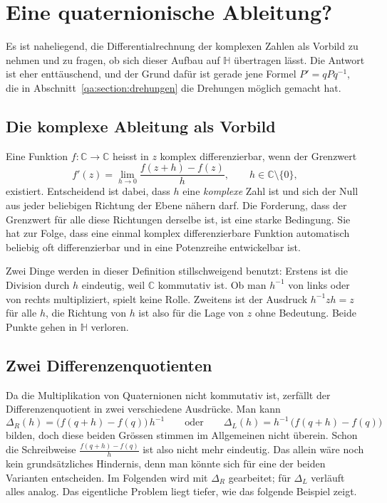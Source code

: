 %
%
%
\section{Eine quaternionische Ableitung?\label{qa:section:ableitung}}

Es ist naheliegend, die Differentialrechnung der komplexen Zahlen als Vorbild zu 
nehmen und zu fragen, ob sich dieser Aufbau auf $\mathbb{H}$ übertragen lässt. Die
Antwort ist eher enttäuschend, und der Grund dafür ist gerade jene Formel
$P' = qPq^{-1}$, die in Abschnitt~\ref{qa:section:drehungen} die Drehungen
möglich gemacht hat.

\subsection{Die komplexe Ableitung als Vorbild}
Eine Funktion $f\colon \mathbb{C} \to \mathbb{C}$ heisst in $z$ komplex
differenzierbar, wenn der Grenzwert
\begin{equation*}
    f'(z) = \lim_{h \to 0} \frac{f(z+h) - f(z)}{h}, \qquad h \in \mathbb{C}
    \setminus \{0\},
\end{equation*}
existiert. Entscheidend ist dabei, dass $h$ eine \emph{komplexe} Zahl ist und
sich der Null aus jeder beliebigen Richtung der Ebene nähern darf. Die
Forderung, dass der Grenzwert für alle diese Richtungen derselbe ist, ist eine
starke Bedingung. Sie hat zur Folge, dass eine einmal
komplex differenzierbare Funktion automatisch beliebig oft differenzierbar und
in eine Potenzreihe entwickelbar ist.

Zwei Dinge werden in dieser Definition stillschweigend benutzt: Erstens ist die
Division durch $h$ eindeutig, weil $\mathbb{C}$ kommutativ ist. Ob man
$h^{-1}$ von links oder von rechts multipliziert, spielt keine Rolle. Zweitens ist
der Ausdruck $h^{-1} z h = z$ für alle $h$, die Richtung von $h$ ist also für
die Lage von $z$ ohne Bedeutung. Beide Punkte gehen in $\mathbb{H}$ verloren.

\subsection{Zwei Differenzenquotienten}
Da die Multiplikation von Quaternionen nicht kommutativ ist, zerfällt der
Differenzenquotient in zwei verschiedene Ausdrücke. Man kann
\begin{equation*}
    \Delta_R(h) = \bigl(f(q+h) - f(q)\bigr)\,h^{-1}
    \qquad\text{oder}\qquad
    \Delta_L(h) = h^{-1}\,\bigl(f(q+h) - f(q)\bigr)
\end{equation*}
%
%
bilden, doch diese beiden Grössen stimmen im Allgemeinen nicht überein. Schon
die Schreibweise $\frac{f(q+h)-f(q)}{h}$ ist also nicht mehr eindeutig. Das
allein wäre noch kein grundsätzliches Hindernis, denn man könnte sich für eine der
beiden Varianten entscheiden. Im Folgenden wird mit $\Delta_R$ gearbeitet; für
$\Delta_L$ verläuft alles analog. Das eigentliche Problem liegt tiefer, wie das
folgende Beispiel zeigt.

